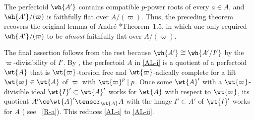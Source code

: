 \brem
The perfectoid $\wh{A'}$ contains compatible $p$-power roots of every $a \in A$, and $\wh{A'}/(\varpi)$ is faithfully flat over $A/(\varpi)$. Thus, the preceding theorem  recovers the original lemma of Andr\'{e} \cite{Bha18a}*{Theorem~1.5}, in which one only required $\wh{A'}/(\varpi)$ to be \emph{almost} faithfully flat over $A/(\varpi)$.
\erem


\bpp[]
The final assertion follows from the rest because $\wh{A'} \cong \wh{A'/I'}$ by the $\varpi$-divisibility of $I'$.
 By , the perfectoid $A$ in \ref{AL-i} is a quotient of a perfectoid $\wt{A}$ that is $\wt{\varpi}$-torsion free and $\wt{\varpi}$-adically complete  for a lift $\wt{\varpi} \in \wt{A}$ of $\varpi$ with $\wt{\varpi}^p \mid p$. Once some $\wt{A}'$ with a $\wt{\varpi}$-divisible ideal $\wt{I}' \subset \wt{A}'$ works for $\wt{A}$ with respect to $\wt{\varpi}$, its quotient $A' \ce \wt{A}' \tensor_{\wt{A}} A$ with the image $I' \subset A'$ of $\wt{I}'$ works for $A$ (%
see ~\ref{R-a}).
This reduces \ref{AL-i} to \ref{AL-ii}.

